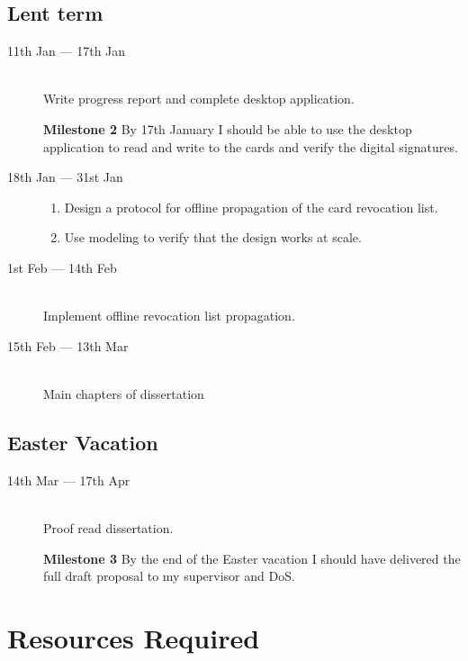 \documentclass[a4paper, 12pt]{article}
\begin{document}
  \subsection*{Lent term}
  \begin{description}
    \item[11th Jan --- 17th Jan] \hfill \\
      Write progress report and complete desktop application.


      \textbf{Milestone 2}
      By 17th January I should be able to use the desktop application to read
      and write to the cards and verify the digital signatures.

    \item[18th Jan --- 31st Jan] \hfill
      \begin{enumerate}
        \item Design a protocol for offline propagation of the card revocation
          list.
        \item Use modeling to verify that the design works at scale.
      \end{enumerate}

    \item[1st Feb --- 14th Feb] \hfill \\
      Implement offline revocation list propagation.

    \item[15th Feb --- 13th Mar] \hfill \\
      Main chapters of dissertation

  \end{description}

  \subsection*{Easter Vacation}
  \begin{description}
    \item[14th Mar --- 17th Apr] \hfill \\
      Proof read dissertation.

      \textbf{Milestone 3}
      By the end of the Easter vacation I should have delivered the full draft
      proposal to my supervisor and DoS.
  \end{description}


  \section*{Resources Required}
\end{document}
